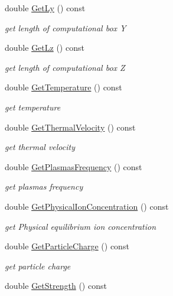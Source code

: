 \begin{DoxyCompactItemize}
double \mbox{\hyperlink{classconverter_a0354538702fac302486d859d62afbcfc}{Get\+Ly}} () const
\begin{DoxyCompactList}\small\item\em get length of computational box Y \end{DoxyCompactList}\item 
double \mbox{\hyperlink{classconverter_af9260fc37b19c80b72fde252e6c71ef8}{Get\+Lz}} () const
\begin{DoxyCompactList}\small\item\em get length of computational box Z \end{DoxyCompactList}\item 
double \mbox{\hyperlink{classconverter_ab4f324a1ff9ac52d10a6b11ad588e6df}{Get\+Temperature}} () const
\begin{DoxyCompactList}\small\item\em get temperature \end{DoxyCompactList}\item 
double \mbox{\hyperlink{classconverter_a638841356fabc1a3f3b2d1d4d4daed01}{Get\+Thermal\+Velocity}} () const
\begin{DoxyCompactList}\small\item\em get thermal velocity \end{DoxyCompactList}\item 
double \mbox{\hyperlink{classconverter_a96c9c79210fcc04ac0ba358e7fa8cdf1}{Get\+Plasmas\+Frequency}} () const
\begin{DoxyCompactList}\small\item\em get plasmas frequency \end{DoxyCompactList}\item 
double \mbox{\hyperlink{classconverter_a87a37cd0526fafb393e1fcf74a0884da}{Get\+Physical\+Ion\+Concentration}} () const
\begin{DoxyCompactList}\small\item\em get Physical equilibrium ion concentration \end{DoxyCompactList}\item 
double \mbox{\hyperlink{classconverter_a4c56e589a4a71b7421a2523cb471b747}{Get\+Particle\+Charge}} () const
\begin{DoxyCompactList}\small\item\em get particle charge \end{DoxyCompactList}\item 
double \mbox{\hyperlink{classconverter_af57bd275b4cf7495a5bdf23e47bbcd15}{Get\+Strength}} () const

\end{DoxyCompactItemize}
